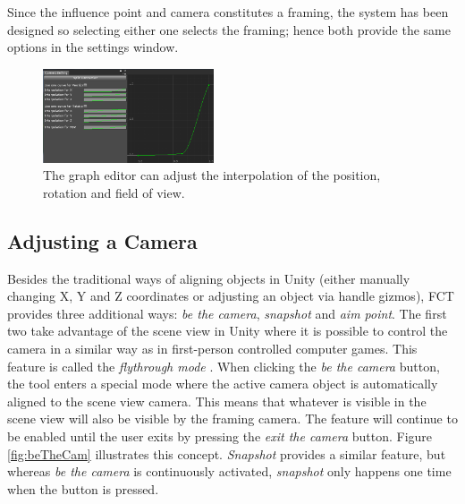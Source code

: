 
Since the influence point and camera constitutes a framing, the system has been designed so selecting either one selects the framing; hence both provide the same options in the settings window.

\begin{figure}[htbp]
\centering
\includegraphics[width=0.45\textwidth]{Pics/curve}
\caption{The graph editor can adjust the interpolation of the position, rotation and field of view.}
\label{fig:curve}
\end{figure}
\subsection{Adjusting a Camera}

Besides the traditional ways of aligning objects in Unity (either manually changing X, Y and Z coordinates or adjusting an object via handle gizmos), FCT provides three additional ways: \textit{be the camera}, \textit{snapshot} and \textit{aim point}. The first two take advantage of the scene view in Unity where it is possible to control the camera in a similar way as in first-person controlled computer games. This feature is called the \textit{flythrough mode} \cite{unity_flyMode}. When clicking the \textit{be the camera} button, the tool enters a special mode where the active camera object is automatically aligned to the scene view camera. This means that whatever is visible in the scene view will also be visible by the framing camera. The feature will continue to be enabled until the user exits by pressing the \textit{exit the camera} button. Figure \ref{fig:beTheCam} illustrates this concept. \textit{Snapshot} provides a similar feature, but whereas \textit{be the camera} is continuously activated, \textit{snapshot} only happens one time when the button is pressed.

